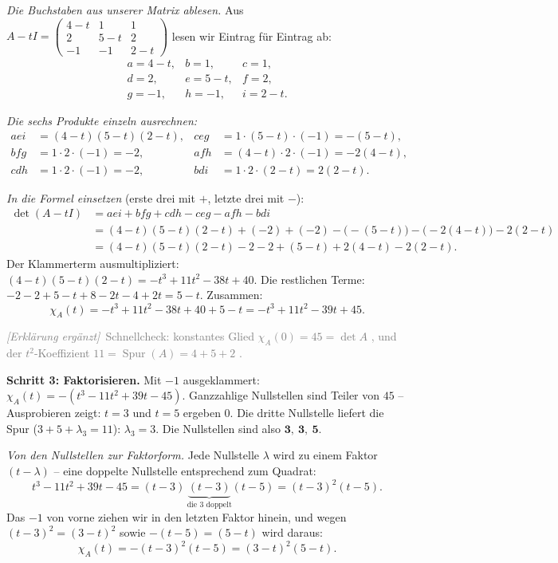 \documentclass[a4paper,12pt]{article}
\newcommand{\erglerk}{\textcolor{gray}{\small\textit{[Erkl\"arung erg\"anzt]}}}
\begin{document}
\emph{Die Buchstaben aus unserer Matrix ablesen.} Aus $A - tI = \left(\begin{smallmatrix} 4-t & 1 & 1 \\ 2 & 5-t & 2 \\ -1 & -1 & 2-t \end{smallmatrix}\right)$ lesen wir Eintrag f\"ur Eintrag ab:
\[
\begin{array}{lll}
a = 4-t, & b = 1, & c = 1, \\
d = 2, & e = 5-t, & f = 2, \\
g = -1, & h = -1, & i = 2-t.
\end{array}
\]

\emph{Die sechs Produkte einzeln ausrechnen:}
\begin{align*}
aei &= (4-t)(5-t)(2-t), & ceg &= 1\cdot(5-t)\cdot(-1) = -(5-t), \\
bfg &= 1\cdot 2\cdot(-1) = -2, & afh &= (4-t)\cdot 2\cdot(-1) = -2(4-t), \\
cdh &= 1\cdot 2\cdot(-1) = -2, & bdi &= 1\cdot 2\cdot(2-t) = 2(2-t).
\end{align*}

\emph{In die Formel einsetzen} (erste drei mit $+$, letzte drei mit $-$):
\begin{align*}
\det(A - tI) &= aei + bfg + cdh - ceg - afh - bdi \\
&= (4-t)(5-t)(2-t) + (-2) + (-2) - \big(-(5-t)\big) - \big(-2(4-t)\big) - 2(2-t) \\
&= (4-t)(5-t)(2-t) - 2 - 2 + (5-t) + 2(4-t) - 2(2-t).
\end{align*}
Der Klammerterm ausmultipliziert: $(4-t)(5-t)(2-t) = -t^3 + 11t^2 - 38t + 40$. Die restlichen Terme: $-2 -2 +5 -t +8 -2t -4 +2t = 5 - t$. Zusammen:
\[
\chi_A(t) = -t^3 + 11t^2 - 38t + 40 + 5 - t = -t^3 + 11t^2 - 39t + 45.
\]

\erglerk\ \textcolor{gray}{\small Schnellcheck: konstantes Glied $\chi_A(0) = 45 = \det A$ \checkmark, und der $t^2$-Koeffizient $11 = \operatorname{Spur}(A) = 4+5+2$ \checkmark.}

\textbf{Schritt 3: Faktorisieren.} Mit $-1$ ausgeklammert: $\chi_A(t) = -(t^3 - 11t^2 + 39t - 45)$. Ganzzahlige Nullstellen sind Teiler von $45$ -- Ausprobieren zeigt: $t = 3$ und $t = 5$ ergeben $0$. Die dritte Nullstelle liefert die Spur ($3 + 5 + \lambda_3 = 11$): $\lambda_3 = 3$. Die Nullstellen sind also $\mathbf{3,\ 3,\ 5}$.

\emph{Von den Nullstellen zur Faktorform.} Jede Nullstelle $\lambda$ wird zu einem Faktor $(t - \lambda)$ -- eine doppelte Nullstelle entsprechend zum Quadrat:
\[
t^3 - 11t^2 + 39t - 45 = (t-3)\,\underbrace{(t-3)}_{\text{die } 3 \text{ doppelt}}(t-5) = (t-3)^2(t-5).
\]
Das $-1$ von vorne ziehen wir in den letzten Faktor hinein, und wegen $(t-3)^2 = (3-t)^2$ sowie $-(t-5) = (5-t)$ wird daraus:
\[
\boxed{\chi_A(t) = -(t-3)^2(t-5) = (3-t)^2(5-t).}
\]
\end{document}
